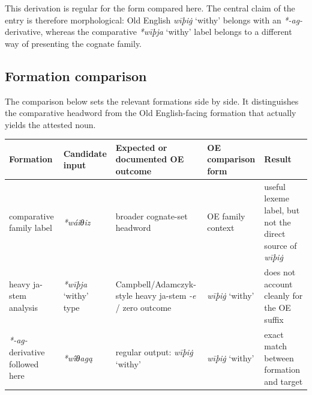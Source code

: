 \documentclass[
  british,
  a4paper,
  openany]{book}
\newcounter{none} %
\providecommand{\Recon}[1]{\emph{*#1}}
{\catcode`→=\active \global\def→{\ensuremath{\rightarrow}}}
\providecommand{\Recon}[1]{\emph{*#1}}
{\catcode`→=\active \global\def→{\ensuremath{\rightarrow}}}
\begin{document}
This derivation is regular for the form compared here. The central claim
of the entry is therefore morphological: Old English \emph{wīþiġ}
`withy' belongs with an \emph{*-ag-} derivative, whereas the comparative
\Recon{wīþja} `withy' label belongs to a different way of presenting the
cognate family.

\subsection{Formation comparison}\label{formation-comparison-8}

The comparison below sets the relevant formations side by side. It
distinguishes the comparative headword from the Old English-facing
formation that actually yields the attested noun.

{\def\LTcaptype{none} %
\begin{longtable}[]{@{}
  >{\raggedright\arraybackslash}p{}
  >{\raggedright\arraybackslash}p{}
  >{\raggedright\arraybackslash}p{}
  >{\raggedright\arraybackslash}p{}
  >{\raggedright\arraybackslash}p{}@{}}
\toprule\noalign{}
\begin{minipage}[b]{\linewidth}\raggedright
Formation
\end{minipage} & \begin{minipage}[b]{\linewidth}\raggedright
Candidate input
\end{minipage} & \begin{minipage}[b]{\linewidth}\raggedright
Expected or documented OE outcome
\end{minipage} & \begin{minipage}[b]{\linewidth}\raggedright
OE comparison form
\end{minipage} & \begin{minipage}[b]{\linewidth}\raggedright
Result
\end{minipage} \\
\midrule\noalign{}
\endhead
\bottomrule\noalign{}
\endlastfoot
comparative family label & {\emph{*wáiθiz}} & broader cognate-set
headword & OE family context & useful lexeme label, but not the direct
source of \emph{wīþiġ} \\
heavy ja-stem analysis & \Recon{wīþja} `withy' type &
Campbell/Adamczyk-style heavy ja-stem \emph{-e} / zero outcome &
{\emph{wīþiġ}} `withy' & does not account cleanly for the OE suffix \\
\emph{*-ag-} derivative followed here & {\emph{*wī́θagą}} & regular
output: {\emph{wīþiġ}} `withy' & {\emph{wīþiġ}} `withy' & exact match
between formation and target \\
\end{longtable}
}
\end{document}
